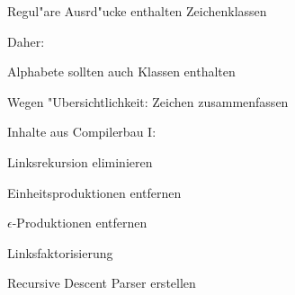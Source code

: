 {
\begin{itemgroup}{}
   \item Regul"are Ausrd"ucke enthalten Zeichenklassen
   
   \item Daher:
   \begin{itemgroup}{}
      \item Alphabete sollten auch Klassen enthalten
   \end{itemgroup}
   
   \item Wegen "Ubersichtlichkeit: Zeichen zusammenfassen
\end{itemgroup}
\vfill{}
}

{
\begin{itemgroup}{}
   \item Inhalte aus Compilerbau I:
   \begin{itemgroup}{}
      \item Linksrekursion eliminieren
      
      \item Einheitsproduktionen entfernen
      
      \item $\epsilon$-Produktionen entfernen
      
      \item Linksfaktorisierung
      
      \item Recursive Descent Parser erstellen
   \end{itemgroup}
\end{itemgroup}
\vfill{}
}
